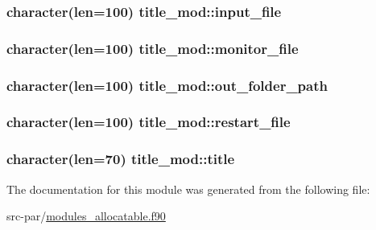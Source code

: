 \hypertarget{classtitle__mod_a64fc03558006dbdf36a10564ba2afc89}{
\subsubsection[{input\-\_\-file}]{\setlength{\rightskip}{0pt plus 5cm}character(len=100) title\-\_\-mod\-::input\-\_\-file}}\label{classtitle__mod_a64fc03558006dbdf36a10564ba2afc89}
\hypertarget{classtitle__mod_a0c25de734abd2098468902978c3b1171}{
\subsubsection[{monitor\-\_\-file}]{\setlength{\rightskip}{0pt plus 5cm}character(len=100) title\-\_\-mod\-::monitor\-\_\-file}}\label{classtitle__mod_a0c25de734abd2098468902978c3b1171}
\hypertarget{classtitle__mod_af12af9d69b3792960354c4f2b3a9a955}{
\subsubsection[{out\-\_\-folder\-\_\-path}]{\setlength{\rightskip}{0pt plus 5cm}character(len=100) title\-\_\-mod\-::out\-\_\-folder\-\_\-path}}\label{classtitle__mod_af12af9d69b3792960354c4f2b3a9a955}
\hypertarget{classtitle__mod_a7994996b990659c9df719ca4ba2aaf5f}{
\subsubsection[{restart\-\_\-file}]{\setlength{\rightskip}{0pt plus 5cm}character(len=100) title\-\_\-mod\-::restart\-\_\-file}}\label{classtitle__mod_a7994996b990659c9df719ca4ba2aaf5f}
\hypertarget{classtitle__mod_a16d499c2271f74325813048133f6b947}{
\subsubsection[{title}]{\setlength{\rightskip}{0pt plus 5cm}character(len=70) title\-\_\-mod\-::title}}\label{classtitle__mod_a16d499c2271f74325813048133f6b947}


The documentation for this module was generated from the following file\-:\begin{DoxyCompactItemize}
\item 
src-\/par/\hyperlink{modules__allocatable_8f90}{modules\-\_\-allocatable.\-f90}\end{DoxyCompactItemize}
